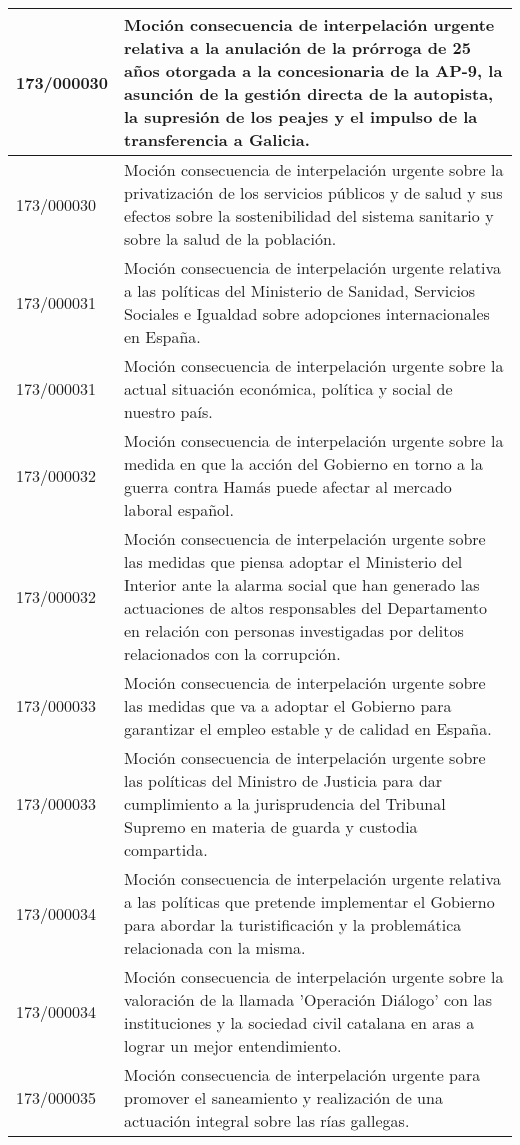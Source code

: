 {\begin{table}[H]
\begin{center}
\begin{tabularx}{\linewidth}{| l | X |}
\hline
173/000030 & Moción consecuencia de interpelación urgente relativa a la anulación de la prórroga de 25 años otorgada a la concesionaria de la AP-9, la asunción de la gestión directa de la autopista, la supresión de los peajes y el impulso de la transferencia a Galicia. \\
\hline
173/000030 & Moción consecuencia de interpelación urgente sobre la privatización de los servicios públicos y de salud y sus efectos sobre la sostenibilidad del sistema sanitario y sobre la salud de la población. \\
\hline
173/000031 & Moción consecuencia de interpelación urgente relativa a las políticas del Ministerio de Sanidad, Servicios Sociales e Igualdad sobre adopciones internacionales en España. \\
\hline
173/000031 & Moción consecuencia de interpelación urgente sobre la actual situación económica, política y social de nuestro país. \\
\hline
173/000032 & Moción consecuencia de interpelación urgente sobre la medida en que la acción del Gobierno en torno a la guerra contra Hamás puede afectar al mercado laboral español. \\
\hline
173/000032 & Moción consecuencia de interpelación urgente sobre las medidas que piensa adoptar el Ministerio del Interior ante la alarma social que han generado las actuaciones de altos responsables del Departamento en relación con personas investigadas por delitos relacionados con la corrupción. \\
\hline
173/000033 & Moción consecuencia de interpelación urgente sobre las medidas que va a adoptar el Gobierno para garantizar el empleo estable y de calidad en España. \\
\hline
173/000033 & Moción consecuencia de interpelación urgente sobre las políticas del Ministro de Justicia para dar cumplimiento a la jurisprudencia del Tribunal Supremo en materia de guarda y custodia compartida. \\
\hline
173/000034 & Moción consecuencia de interpelación urgente relativa a las políticas que pretende implementar el Gobierno para abordar la turistificación y la problemática relacionada con la misma. \\
\hline
173/000034 & Moción consecuencia de interpelación urgente sobre la valoración de la llamada 'Operación Diálogo' con las instituciones y la sociedad civil catalana en aras a lograr un mejor entendimiento. \\
\hline
173/000035 & Moción consecuencia de interpelación urgente para promover el saneamiento y realización de una actuación integral sobre las rías gallegas. \\

\end{tabularx}
\end{center}
\end{table}}
